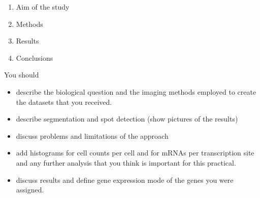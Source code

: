\documentclass[11pt]{article} %
\begin{document}
\begin{enumerate}
\item Aim of the study
\item Methods
\item Results
\item Conclusions
\end{enumerate}

You should 
\begin{itemize}
\item describe the biological question and the imaging methods employed to create the datasets that you received. 
\item describe segmentation and spot detection (show pictures of the results)
\item discuss problems and limitations of the approach
\item add histograms for cell counts per cell and for mRNAs per transcription site and any further analysis that you think is important for this practical. 
\item discuss results and define gene expression mode of the genes you were assigned. 
\end{itemize}
\end{document}
